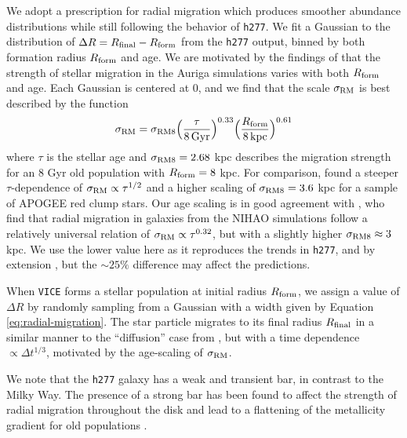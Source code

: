 \documentclass[twocolumn,twocolappendix,linenumbers]{aastex631}
\newcommand{\vice}{{\tt VICE}\xspace}
\newcommand{\hydro}{{\tt h277}\xspace}
\begin{document}
We adopt a prescription for radial migration which produces smoother abundance distributions while still following the behavior of \hydro. We fit a Gaussian to the distribution of $\Delta R = R_{\rm final} - R_{\rm form}$ from the \hydro output, binned by both formation radius $R_{\rm form}$ and age. We are motivated by the findings of \citet{Okalidis2022-AurigaMigration} that the strength of stellar migration in the Auriga simulations \citep{Grand2017-AurigaSims} varies with both $R_{\rm form}$ and age. Each Gaussian is centered at 0, and we find that the scale $\sigma_{\rm RM}$ is best described by the function
\begin{equation}
    \sigma_{\rm RM} = \sigma_{\rm RM8} \Big(\frac{\tau}{8\,{\rm Gyr}}\Big)^{0.33} \Big(\frac{R_{\rm form}}{8\,{\rm kpc}}\Big)^{0.61}
    \label{eq:radial-migration}
\end{equation}
where $\tau$ is the stellar age and $\sigma_{\rm RM8}=2.68$ kpc describes the migration strength for an 8 Gyr old population with $R_{\rm form}=8$ kpc. 
For comparison, \citet{Frankel2018-RadialMigration} found a steeper $\tau$-dependence of $\sigma_{\rm RM}\propto \tau^{1/2}$ and a higher scaling of $\sigma_{\rm RM8}=3.6$ kpc for a sample of APOGEE red clump stars.
Our age scaling is in good agreement with \citet{Lu2023-LMCStars}, who find that radial migration in galaxies from the NIHAO simulations \citep{Wang2015-NIHAOSims} follow a relatively universal relation of $\sigma_{\rm RM}\propto\tau^{0.32}$, but with a slightly higher $\sigma_{\rm RM8}\approx3$ kpc. We use the lower value here as it reproduces the trends in \hydro, and by extension , but the $\sim25\%$ difference may affect the predictions.

When \vice forms a stellar population at initial radius $R_{\rm form}$, we assign a value of $\Delta R$ by randomly sampling from a Gaussian with a width given by Equation \ref{eq:radial-migration}. The star particle migrates to its final radius $R_{\rm final}$ in a similar manner to the ``diffusion'' case from , but with a time dependence $\propto \Delta t^{1/3}$, motivated by the age-scaling of $\sigma_{\rm RM}$.

We note that the \hydro galaxy has a weak and transient bar, in contrast to the Milky Way. The presence of a strong bar has been found to affect the strength of radial migration throughout the disk \citep[e.g.,][]{Brunetti2011-BarredSpiralDiffusion} and lead to a flattening of the metallicity gradient for old populations \citep{Okalidis2022-AurigaMigration}.
\end{document}
